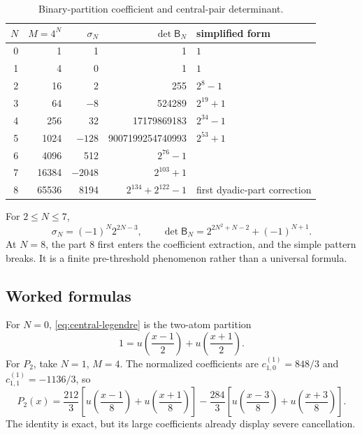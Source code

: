 \documentclass[11pt,oneside]{article}
\numberwithin{equation}{section}
\theoremstyle{definition}
\theoremstyle{remark}
\begin{document}
\begin{table}[htbp]
\centering
\caption{Binary-partition coefficient and central-pair determinant.}
\label{tab:det-values}
\begin{tabular}{rrrrl}
\toprule
$N$ & $M=4^N$ & $\sigma_N$ & $\det\mathsf B_N$ & simplified form\\
\midrule
0&1&1&1&$1$\\
1&4&0&1&$1$\\
2&16&2&255&$2^8-1$\\
3&64&$-8$&524289&$2^{19}+1$\\
4&256&32&17179869183&$2^{34}-1$\\
5&1024&$-128$&9007199254740993&$2^{53}+1$\\
6&4096&512&$2^{76}-1$&\\
7&16384&$-2048$&$2^{103}+1$&\\
8&65536&8194&$2^{134}+2^{122}-1$&first dyadic-part correction\\
\bottomrule
\end{tabular}
\end{table}

For $2\le N\le7$,
\begin{equation}
 \sigma_N=(-1)^N2^{2N-3},\qquad
 \det\mathsf B_N=2^{2N^2+N-2}+(-1)^{N+1}.
 \label{eq:prethreshold-pattern}
\end{equation}
At $N=8$, the part $8$ first enters the coefficient extraction, and the simple
pattern breaks.  It is a finite pre-threshold phenomenon rather than a
universal formula.

\subsection{Worked formulas}

For $N=0$, \eqref{eq:central-legendre} is the two-atom partition
\begin{equation}
 1=u\!\left(\frac{x-1}{2}\right)+u\!\left(\frac{x+1}{2}\right).
 \label{eq:P0-central}
\end{equation}
For $P_2$, take $N=1$, $M=4$.  The normalized coefficients are
$c_{1,0}^{(1)}=848/3$ and $c_{1,1}^{(1)}=-1136/3$, so
\begin{equation}
 \boxed{
 P_2(x)=\frac{212}{3}
 \left[u\!\left(\frac{x-1}{8}\right)+u\!\left(\frac{x+1}{8}\right)\right]
 -\frac{284}{3}
 \left[u\!\left(\frac{x-3}{8}\right)+u\!\left(\frac{x+3}{8}\right)\right].}
 \label{eq:P2-central}
\end{equation}
The identity is exact, but its large coefficients already display severe
cancellation.
\end{document}
